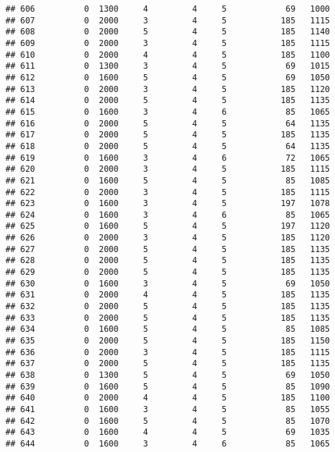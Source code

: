 \documentclass[]{article}
\begin{document}
\begin{verbatim}
## 606          0  1300     4         4     5            69   1000
## 607          0  2000     3         4     5           185   1115
## 608          0  2000     5         4     5           185   1140
## 609          0  2000     3         4     5           185   1115
## 610          0  2000     4         4     5           185   1100
## 611          0  1300     3         4     5            69   1015
## 612          0  1600     5         4     5            69   1050
## 613          0  2000     3         4     5           185   1120
## 614          0  2000     5         4     5           185   1135
## 615          0  1600     3         4     6            85   1065
## 616          0  2000     5         4     5            64   1135
## 617          0  2000     5         4     5           185   1135
## 618          0  2000     5         4     5            64   1135
## 619          0  1600     3         4     6            72   1065
## 620          0  2000     3         4     5           185   1115
## 621          0  1600     5         4     5            85   1085
## 622          0  2000     3         4     5           185   1115
## 623          0  1600     3         4     5           197   1078
## 624          0  1600     3         4     6            85   1065
## 625          0  1600     5         4     5           197   1120
## 626          0  2000     3         4     5           185   1120
## 627          0  2000     5         4     5           185   1135
## 628          0  2000     5         4     5           185   1135
## 629          0  2000     5         4     5           185   1135
## 630          0  1600     3         4     5            69   1050
## 631          0  2000     4         4     5           185   1135
## 632          0  2000     5         4     5           185   1135
## 633          0  2000     5         4     5           185   1135
## 634          0  1600     5         4     5            85   1085
## 635          0  2000     5         4     5           185   1150
## 636          0  2000     3         4     5           185   1115
## 637          0  2000     5         4     5           185   1135
## 638          0  1300     5         4     5            69   1050
## 639          0  1600     5         4     5            85   1090
## 640          0  2000     4         4     5           185   1100
## 641          0  1600     3         4     5            85   1055
## 642          0  1600     5         4     5            85   1070
## 643          0  1600     4         4     5            69   1035
## 644          0  1600     3         4     6            85   1065

\end{verbatim}
\end{document}
